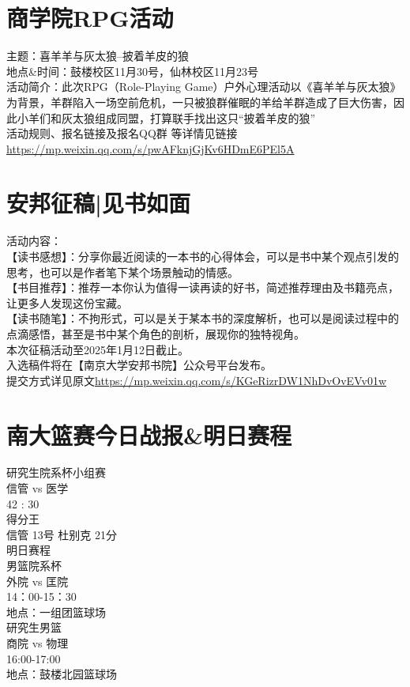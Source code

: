 \documentclass[letterpaper, 12pt]{article}
\begin{document}
\begin{multicols}{2}
\section{商学院RPG活动}
主题：喜羊羊与灰太狼--披着羊皮的狼
\\地点\&时间：鼓楼校区11月30号，仙林校区11月23号
\\活动简介：此次RPG（Role-Playing Game）户外心理活动以《喜羊羊与灰太狼》为背景，羊群陷入一场空前危机，一只被狼群催眠的羊给羊群造成了巨大伤害，因此小羊们和灰太狼组成同盟，打算联手找出这只“披着羊皮的狼”
\\活动规则、报名链接及报名QQ群 等详情见链接\url{https://mp.weixin.qq.com/s/pwAFknjGjKv6HDmE6PEl5A}

\section{安邦征稿|见书如面}
活动内容：\\
【读书感想】：分享你最近阅读的一本书的心得体会，可以是书中某个观点引发的思考，也可以是作者笔下某个场景触动的情感。\\
【书目推荐】：推荐一本你认为值得一读再读的好书，简述推荐理由及书籍亮点，让更多人发现这份宝藏。\\
【读书随笔】：不拘形式，可以是关于某本书的深度解析，也可以是阅读过程中的点滴感悟，甚至是书中某个角色的剖析，展现你的独特视角。\\
本次征稿活动至2025年1月12日截止。\\
入选稿件将在【南京大学安邦书院】公众号平台发布。\\
提交方式详见原文\url{https://mp.weixin.qq.com/s/KGeRizrDW1NhDvOvEVv01w}

\section{南大篮赛今日战报&明日赛程}
研究生院系杯小组赛\\
信管 vs 医学\\
42 : 30\\
得分王\\
信管 13号 杜别克 21分\\
明日赛程\\
男篮院系杯\\
外院 vs 匡院\\
14：00-15：30\\
地点：一组团篮球场\\
研究生男篮\\
商院 vs 物理\\ 
16:00-17:00\\
地点：鼓楼北园篮球场\\


\end{multicols} 
\end{document}
